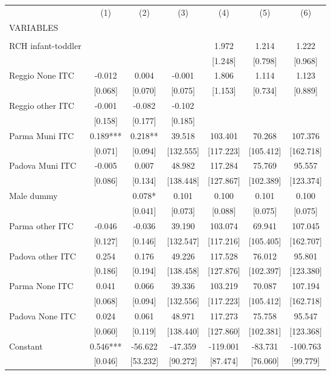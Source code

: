 \begin{tabular}{lcccccc} \hline
 & (1) & (2) & (3) & (4) & (5) & (6) \\
VARIABLES &  &  &  &  &  &  \\ \hline
 &  &  &  &  &  &  \\
RCH infant-toddler &  &  &  & 1.972 & 1.214 & 1.222 \\
 &  &  &  & [1.248] & [0.798] & [0.968] \\
Reggio None ITC & -0.012 & 0.004 & -0.001 & 1.806 & 1.114 & 1.123 \\
 & [0.068] & [0.070] & [0.075] & [1.153] & [0.734] & [0.889] \\
Reggio other ITC & -0.001 & -0.082 & -0.102 &  &  &  \\
 & [0.158] & [0.177] & [0.185] &  &  &  \\
Parma Muni ITC & 0.189*** & 0.218** & 39.518 & 103.401 & 70.268 & 107.376 \\
 & [0.071] & [0.094] & [132.555] & [117.223] & [105.412] & [162.718] \\
Padova Muni ITC & -0.005 & 0.007 & 48.982 & 117.284 & 75.769 & 95.557 \\
 & [0.086] & [0.134] & [138.448] & [127.867] & [102.389] & [123.374] \\
Male dummy &  & 0.078* & 0.101 & 0.100 & 0.101 & 0.100 \\
 &  & [0.041] & [0.073] & [0.088] & [0.075] & [0.075] \\
Parma other ITC & -0.046 & -0.036 & 39.190 & 103.074 & 69.941 & 107.045 \\
 & [0.127] & [0.146] & [132.547] & [117.216] & [105.405] & [162.707] \\
Padova other ITC & 0.254 & 0.176 & 49.226 & 117.528 & 76.012 & 95.801 \\
 & [0.186] & [0.194] & [138.458] & [127.876] & [102.397] & [123.380] \\
Parma None ITC & 0.041 & 0.066 & 39.336 & 103.219 & 70.087 & 107.194 \\
 & [0.068] & [0.094] & [132.556] & [117.223] & [105.412] & [162.718] \\
Padova None ITC & 0.024 & 0.061 & 48.971 & 117.273 & 75.758 & 95.547 \\
 & [0.060] & [0.119] & [138.440] & [127.860] & [102.381] & [123.368] \\
Constant & 0.546*** & -56.622 & -47.359 & -119.001 & -83.731 & -100.763 \\
 & [0.046] & [53.232] & [90.272] & [87.474] & [76.060] & [99.779] \\

\end{tabular}

